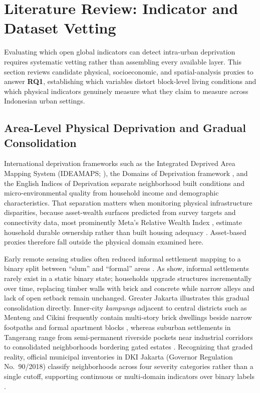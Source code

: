 \section{Literature Review: Indicator and Dataset Vetting}

Evaluating which open global indicators can detect intra-urban deprivation requires systematic vetting rather than assembling every available layer. This section reviews candidate physical, socioeconomic, and spatial-analysis proxies to answer \textbf{RQ1}, establishing which variables distort block-level living conditions and which physical indicators genuinely measure what they claim to measure across Indonesian urban settings.

\subsection{Area-Level Physical Deprivation and Gradual Consolidation}
International deprivation frameworks such as the Integrated Deprived Area Mapping System (IDEAMAPS; \citealt{Thomson2020}), the Domains of Deprivation framework \citep{Abascal2022a}, and the English Indices of Deprivation \citep{MHCLG2019} separate neighborhood built conditions and micro-environmental quality from household income and demographic characteristics. That separation matters when monitoring physical infrastructure disparities, because asset-wealth surfaces predicted from survey targets and connectivity data, most prominently Meta's Relative Wealth Index \citep{Chi2022}, estimate household durable ownership rather than built housing adequacy \citep{Lilford2017}. Asset-based proxies therefore fall outside the physical domain examined here.

Early remote sensing studies often reduced informal settlement mapping to a binary split between ``slum'' and ``formal'' areas \citep{Kuffer2016}. As \citet{Dovey2020} show, informal settlements rarely exist in a static binary state; households upgrade structures incrementally over time, replacing timber walls with brick and concrete while narrow alleys and lack of open setback remain unchanged. Greater Jakarta illustrates this gradual consolidation directly. Inner-city \textit{kampungs} adjacent to central districts such as Menteng and Cikini frequently contain multi-story brick dwellings beside narrow footpaths and formal apartment blocks \citep{Hidayati2020, Mardhotillah2018}, whereas suburban settlements in Tangerang range from semi-permanent riverside pockets near industrial corridors to consolidated neighborhoods bordering gated estates \citep{Wardhani2016}. Recognizing that graded reality, official municipal inventories in DKI Jakarta (Governor Regulation No.~90/2018) classify neighborhoods across four severity categories rather than a single cutoff, supporting continuous or multi-domain indicators over binary labels \citep{Abascal2022b}.

